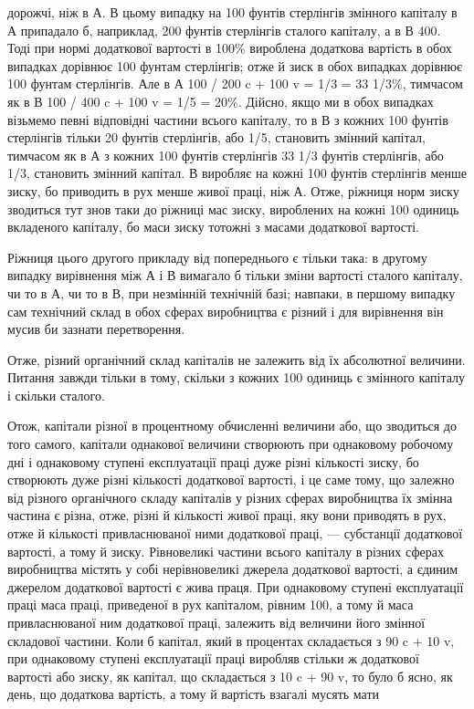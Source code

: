 \parcont{}  %
дорожчі, ніж в А. В цьому випадку на 100 фунтів стерлінгів
змінного капіталу в А припадало б, наприклад, 200 фунтів
стерлінгів сталого капіталу, а в В 400. Тоді при нормі додаткової вартості в 100\% вироблена
додаткова вартість в обох випадках дорівнює 100 фунтам стерлінгів; отже й зиск в обох випадках
дорівнює 100 фунтам стерлінгів. Але в А 100 / 200 c + 100 v =
1/3 = 33 1/3\%, тимчасом як в В 100 / 400 c + 100 v = 1/5 = 20\%. Дійсно,
якщо ми в обох випадках візьмемо певні відповідні частини
всього капіталу, то в В з кожних 100 фунтів стерлінгів тільки
20 фунтів стерлінгів, або 1/5, становить змінний капітал, тимчасом як в А з кожних 100 фунтів
стерлінгів 33 1/3 фунтів стерлінгів, або 1/3, становить змінний капітал. В виробляє на кожні 100
фунтів стерлінгів менше зиску, бо приводить в рух менше
живої праці, ніж А. Отже, ріжниця норм зиску зводиться тут
знов таки до ріжниці мас зиску, вироблених на кожні 100 одиниць вкладеного капіталу, бо маси зиску
тотожні з масами додаткової вартості.

Ріжниця цього другого прикладу від попереднього є тільки
така: в другому випадку вирівнення між А і В вимагало б тільки
зміни вартості сталого капіталу, чи то в А, чи то в В, при незмінній технічній базі; навпаки, в
першому випадку сам технічний склад в обох сферах виробництва є різний і для вирівнення він мусив би
зазнати перетворення.

Отже, різний органічний склад капіталів не залежить від їх
абсолютної величини. Питання завжди тільки в тому, скільки
з кожних 100 одиниць є змінного капіталу і скільки сталого.

Отож, капітали різної в процентному обчисленні величини
або, що зводиться до того самого, капітали однакової величини
створюють при однаковому робочому дні і однаковому ступені
експлуатації праці дуже різні кількості зиску, бо створюють
дуже різні кількості додаткової вартості, і це саме тому, що
залежно від різного органічного складу капіталів у різних сферах виробництва їх змінна частина є
різна, отже, різні й кількості живої праці, яку вони приводять в рух, отже й кількості
привласнюваної ними додаткової праці, — субстанції додаткової
вартості, а тому й зиску. Рівновеликі частини всього капіталу
в різних сферах виробництва містять у собі нерівновеликі джерела додаткової вартості, а єдиним
джерелом додаткової вартості є жива праця. При однаковому ступені експлуатації праці маса праці,
приведеної в рух капіталом, рівним 100, а тому й
маса привласнюваної ним додаткової праці, залежить від величини
його змінної складової частини. Коли б капітал, який в процентах складається з 90 c + 10 v, при
однаковому ступені експлуатації праці виробляв стільки ж додаткової вартості або зиску, як капітал,
що складається з 10 c + 90 v, то було б ясно, як день,
що додаткова вартість, а тому й вартість взагалі мусять мати
\parbreak{}  %
